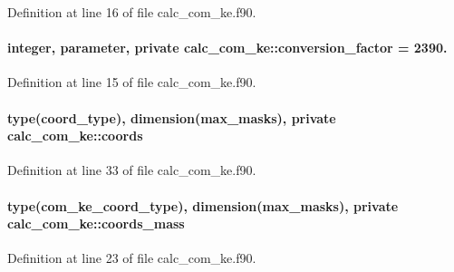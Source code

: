 Definition at line 16 of file calc\-\_\-com\-\_\-ke.\-f90.

\hypertarget{classcalc__com__ke_afdf7cc08c8fb9e8f9a433c4919663503}{
\paragraph[{conversion\-\_\-factor}]{\setlength{\rightskip}{0pt plus 5cm}integer, parameter, private calc\-\_\-com\-\_\-ke\-::conversion\-\_\-factor = 2390.\hspace{0.3cm}{\ttfamily [private]}}}\label{classcalc__com__ke_afdf7cc08c8fb9e8f9a433c4919663503}


Definition at line 15 of file calc\-\_\-com\-\_\-ke.\-f90.

\hypertarget{classcalc__com__ke_addbd4c3ed8ec1df3151b8b40b69a06dd}{
\paragraph[{coords}]{\setlength{\rightskip}{0pt plus 5cm}type({\bf coord\-\_\-type}), dimension({\bf max\-\_\-masks}), private calc\-\_\-com\-\_\-ke\-::coords\hspace{0.3cm}{\ttfamily [private]}}}\label{classcalc__com__ke_addbd4c3ed8ec1df3151b8b40b69a06dd}


Definition at line 33 of file calc\-\_\-com\-\_\-ke.\-f90.

\hypertarget{classcalc__com__ke_a99b829fb93b7f8b50f1886f5cdc00cfe}{
\paragraph[{coords\-\_\-mass}]{\setlength{\rightskip}{0pt plus 5cm}type({\bf com\-\_\-ke\-\_\-coord\-\_\-type}), dimension({\bf max\-\_\-masks}), private calc\-\_\-com\-\_\-ke\-::coords\-\_\-mass\hspace{0.3cm}{\ttfamily [private]}}}\label{classcalc__com__ke_a99b829fb93b7f8b50f1886f5cdc00cfe}


Definition at line 23 of file calc\-\_\-com\-\_\-ke.\-f90.


